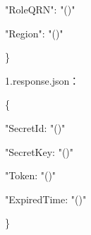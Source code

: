 "RoleQRN": "\@notEmpty()"

"Region": "\@notEmpty()"

\}

1.response.json：

\{

"SecretId: "\@notEmpty()"

"SecretKey: "\@notEmpty()"

"Token: "\@exists()"

"ExpiredTime: "\@exists()"

\}

%
%
%
%
%
%
%


